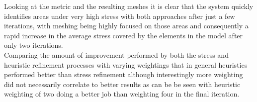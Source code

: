 





\noindent
Looking at the metric and the resulting meshes it is clear that the system quickly identifies areas under very high stress with both approaches after just a few iterations, with meshing being highly focused on those areas and consequently a rapid increase in the average stress covered by the elements in the model after only two iterations. \\ 


\noindent
Comparing the amount of improvement performed by both the stress and heuristic refinement processes with varying weightings that in general heuristics performed better than stress refinement although interestingly more weighting did not necessarily correlate to better results as can be be seen with heuristic weighting of two doing a better job than weighting four in the final iteration. \\





